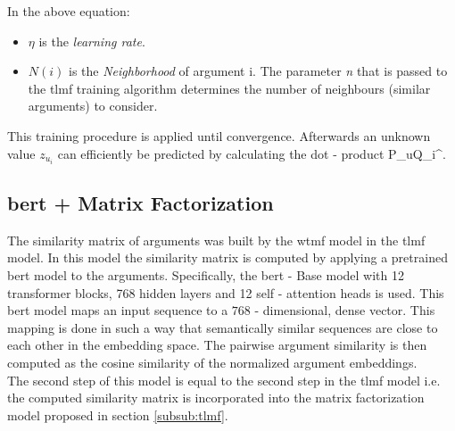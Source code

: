 In the above equation:
\begin{itemize}
    \item $\eta$ is the \textit{learning rate}. 
    \item $N(i)$ is the \textit{Neighborhood} of argument i. The parameter \textit{n} that is passed to the \acrshort{tlmf} training algorithm determines the number of neighbours (similar arguments) to consider.
\end{itemize}
This training procedure is applied until convergence. Afterwards an unknown value $z_u_i$ can efficiently be predicted by calculating the dot - product P_uQ_i^\top.  

\subsection{\acrshort{bert} + Matrix Factorization}
The similarity matrix of arguments was built by the \acrshort{wtmf} model in the \acrshort{tlmf} model. In this model the similarity matrix is computed by applying a pretrained \acrshort{bert} model to the arguments. Specifically, the \acrshort{bert} - Base model with 12 transformer blocks, 768 hidden layers and 12 self - attention heads is used. This \acrshort{bert} model maps an input sequence to a $768$ - dimensional, dense vector. This mapping is done in such a way that semantically similar sequences are close to each other in the embedding space. The pairwise argument similarity is then computed as the cosine similarity of the normalized argument embeddings.\\
The second step of this model is equal to the second step in the \acrshort{tlmf} model i.e. the computed similarity matrix is incorporated into the matrix factorization model proposed in section \ref{subsub:tlmf}. 

